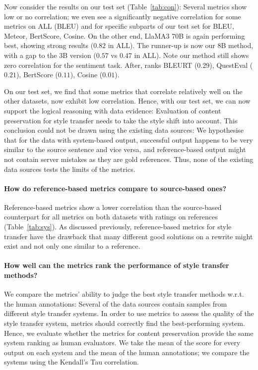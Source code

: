 Now consider the results on our test set (Table~\ref{tab:con}): Several metrics show low or no correlation; we even see a significantly negative correlation for some metrics on ALL (BLEU) and for specific subparts of our test set for BLEU, Meteor, BertScore, Cosine. On the other end, LlaMA3 70B is again performing best, showing strong results ($0.82$ in ALL). The runner-up is now our 8B method, with a gap to the 3B version ($0.57$ vs $0.47$ in ALL). Note our method still shows zero correlation for the sentiment task. After, ranks BLEURT ($0.29$), QuestEval ($0.21$), BertScore ($0.11$), Cosine ($0.01$).  

On our test set, we find that some metrics that correlate relatively well on the other datasets, now exhibit low correlation. Hence, with our test set, we can now support the logical reasoning with data evidence: Evaluation of content preservation for style transfer needs to take the style shift into account. This conclusion could not be drawn using the existing data sources: We hypothesise that for the data with system-based output, successful output happens to be very similar to the source sentence and vice versa, and reference-based output might not contain server mistakes as they are gold references. Thus, none of the existing data sources tests the limits of the metrics.  


\paragraph{How do reference-based metrics compare to source-based ones?} Reference-based metrics show a lower correlation than the source-based counterpart for all metrics on both datasets with ratings on references (Table~\ref{tab:sys}). As discussed previously, reference-based metrics for style transfer have the drawback that many different good solutions on a rewrite might exist and not only one similar to a reference.


\paragraph{How well can the metrics rank the performance of style transfer methods?}
We compare the metrics' ability to judge the best style transfer methods w.r.t. the human annotations: Several of the data sources contain samples from different style transfer systems. In order to use metrics to assess the quality of the style transfer system, metrics should correctly find the best-performing system. Hence, we evaluate whether the metrics for content preservation provide the same system ranking as human evaluators. We take the mean of the score for every output on each system and the mean of the human annotations; we compare the systems using the Kendall's Tau correlation. 

